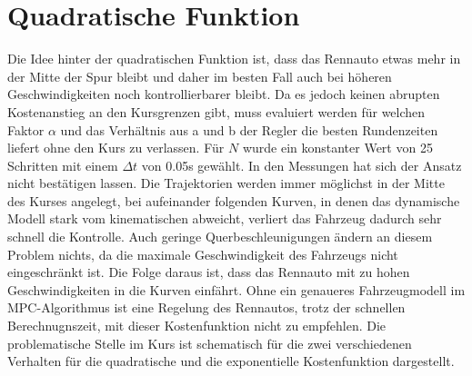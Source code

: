 \documentclass{like}
\begin{document}
\begin{figure}
	\centering
	 
	\caption{}
	\label{fig:deltaTMaxB}
\end{figure}


\section{Quadratische Funktion}
Die Idee hinter der quadratischen Funktion ist, dass das Rennauto etwas mehr in der Mitte der Spur bleibt und daher im besten Fall auch bei höheren Geschwindigkeiten noch kontrollierbarer bleibt. Da es jedoch keinen abrupten Kostenanstieg an den Kursgrenzen gibt, muss evaluiert werden für welchen Faktor $\alpha$ und das Verhältnis aus a und b der Regler die besten Rundenzeiten liefert ohne den Kurs zu verlassen. Für $N$ wurde ein konstanter Wert von 25 Schritten mit einem $\Delta t$ von 0.05s gewählt. In den Messungen hat sich der Ansatz nicht bestätigen lassen. Die Trajektorien werden immer möglichst in der Mitte des Kurses angelegt, bei aufeinander folgenden Kurven, in denen das dynamische Modell stark vom kinematischen abweicht, verliert das Fahrzeug dadurch sehr schnell die Kontrolle. Auch geringe Querbeschleunigungen ändern an diesem Problem nichts, da die maximale Geschwindigkeit des Fahrzeugs nicht eingeschränkt ist. Die Folge daraus ist, dass das Rennauto mit zu hohen Geschwindigkeiten in die Kurven einfährt. Ohne ein genaueres Fahrzeugmodell im \ac{MPC}-Algorithmus ist eine Regelung des Rennautos, trotz der schnellen Berechnugnszeit, mit dieser Kostenfunktion nicht  zu empfehlen.
Die problematische Stelle im Kurs ist schematisch für die zwei verschiedenen Verhalten für die quadratische und die exponentielle Kostenfunktion dargestellt. 
\end{document}
